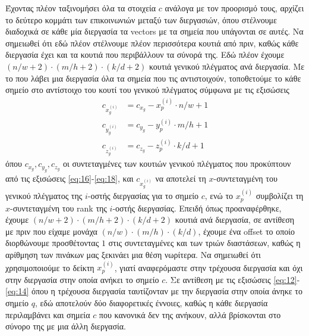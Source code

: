 \documentclass[11pt,a4paper,titlepage]{article}
\begin{document}
 	Έχοντας πλέον ταξινομήσει όλα τα στοιχεία $c$ ανάλογα με τον προορισμό τους, αρχίζει το δεύτερο κομμάτι των επικοινωνιών μεταξύ των διεργασιών, όπου στέλνουμε διαδοχικά σε κάθε μία διεργασία τα vectors με τα σημεία που υπάγονται σε αυτές. Να σημειωθεί ότι εδώ πλέον στέλνουμε πλέον περισσότερα κουτιά από πριν, καθώς κάθε διεργασία έχει και τα κουτιά που περιβάλλουν τα σύνορά της. Εδώ πλέον έχουμε $(n/w+2)\cdot(m/h + 2)\cdot(k/d + 2)$ κουτιά γενικού πλέγματος ανά διεργασία. Με το που λάβει μια διεργασία όλα τα σημεία που τις αντιστοιχούν, τοποθετούμε το κάθε σημείο στο αντίστοιχο του κουτί του γενικού πλέγματος σύμφωνα με τις εξισώσεις
	\begin{align}
	 	c_{x_g^{(i)}} &= c_{x_g} - {x_p^{(i)}}\cdot n/w + 1 \label{eq:23}\\
	 	c_{y_g^{(i)}} &= c_{y_g} - {y_p^{(i)}}\cdot m/h + 1 \label{eq:24}\\
	 	c_{z_g^{(i)}} &= c_{z_g} - {z_p^{(i)}}\cdot k/d + 1 \label{eq:25}
 	\end{align}
 	όπου $c_{x_g}, c_{y_g}, c_{z_g}$ οι συντεταγμένες των κουτιών γενικού πλέγματος που προκύπτουν από τις εξισώσεις \eqref{eq:16}-\eqref{eq:18}, και $c_{x_g^{(i)}}$ να αποτελεί τη $x$-συντεταγμένη του γενικού πλέγματος της $i$-οστής διεργασίας  για το σημείο $c$, ενώ το $x_p^{(i)}$ συμβολίζει τη $x$-συντεταγμένη του rank της $i$-οστής διεργασίας. Επειδή όπως προαναφέρθηκε, έχουμε $(n/w+2)\cdot(m/h + 2)\cdot(k/d + 2)$ κουτιά ανά διεργασία, σε αντίθεση με πριν που είχαμε μονάχα $(n/w)\cdot(m/h)\cdot(k/d)$, έχουμε ένα offset το οποίο διορθώνουμε προσθέτοντας $1$ στις συντεταγμένες και των τριών διαστάσεων, καθώς η αρίθμηση των πινάκων μας ξεκινάει μια θέση νωρίτερα. Να σημειωθεί ότι χρησιμοποιούμε το δείκτη ${x_p^{(i)}}$, γιατί αναφερόμαστε στην τρέχουσα διεργασία και όχι στην διεργασία στην οποία ανήκει το σημείο $c$. Σε αντίθεση με τις εξισώσεις \eqref{eq:12}-\eqref{eq:14} όπου η τρέχουσα διεργασία ταυτίζονταν με την διεργασία στην οποία άνηκε το σημείο $q$, εδώ αποτελούν δύο διαφορετικές έννοιες, καθώς η κάθε διεργασία περιλαμβάνει και σημεία $c$ που κανονικά δεν της ανήκουν, αλλά βρίσκονται στο σύνορο της με μια άλλη διεργασία.\\
 	
\end{document}
